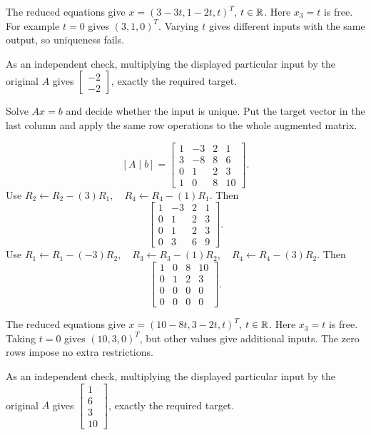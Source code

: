 The reduced equations give $x=(3-3t,1-2t,t)^T$, $t\in\mathbb{R}$. Here $x_3=t$ is free. For example $t=0$ gives $(3,1,0)^T$. Varying $t$ gives different inputs with the same output, so uniqueness fails.

As an independent check, multiplying the displayed particular input by the original $A$ gives $\begin{bmatrix}-2\\-2\end{bmatrix}$, exactly the required target.



\goal Solve $Ax=b$ and decide whether the input is unique. Put the target vector in the last column and apply the same row operations to the whole augmented matrix.

\[ [A\mid b]=\begin{bmatrix}1 & -3 & 2 & 1\\3 & -8 & 8 & 6\\0 & 1 & 2 & 3\\1 & 0 & 8 & 10\end{bmatrix}.\]
Use $R_{2}\leftarrow R_{2}-(3)R_{1},\quad R_{4}\leftarrow R_{4}-(1)R_{1}$. Then
\[ \begin{bmatrix}1 & -3 & 2 & 1\\0 & 1 & 2 & 3\\0 & 1 & 2 & 3\\0 & 3 & 6 & 9\end{bmatrix}.\]
Use $R_{1}\leftarrow R_{1}-(-3)R_{2},\quad R_{3}\leftarrow R_{3}-(1)R_{2},\quad R_{4}\leftarrow R_{4}-(3)R_{2}$. Then
\[ \begin{bmatrix}1 & 0 & 8 & 10\\0 & 1 & 2 & 3\\0 & 0 & 0 & 0\\0 & 0 & 0 & 0\end{bmatrix}.\]

The reduced equations give $x=(10-8t,3-2t,t)^T$, $t\in\mathbb{R}$. Here $x_3=t$ is free. Taking $t=0$ gives $(10,3,0)^T$, but other values give additional inputs. The zero rows impose no extra restrictions.

As an independent check, multiplying the displayed particular input by the original $A$ gives $\begin{bmatrix}1\\6\\3\\10\end{bmatrix}$, exactly the required target.


